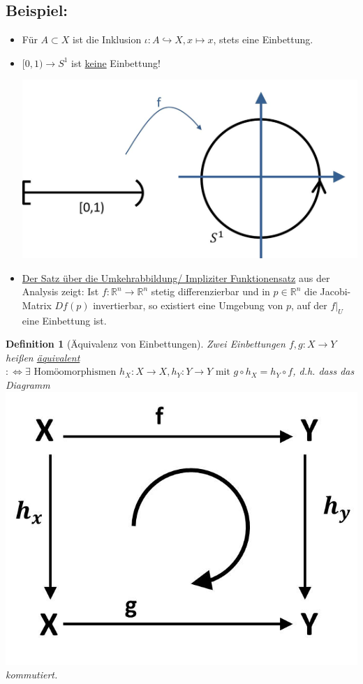 \documentclass[a4paper,11pt,notitlepage]{report}
\newtheorem{definition}{Definition}[chapter]
\newcommand{\R}{{\ensuremath{\mathbb{R}}}}
\newenvironment{bsp}[1]
{
\setlength{\fboxsep}{10pt}
\subsection*{Beispiel: #1}
\begin{upshape}
}
{
\end{upshape}
}
\begin{document}
\begin{bsp}{}
	\begin{itemize}
		\item Für $A \subset X$ ist die Inklusion $\iota \colon A \hookrightarrow X, x \mapsto x$, stets eine Einbettung.
		\item $[0,1) \rightarrow S^1$ ist \underline{keine} Einbettung!
		\begin{center}
			\includegraphics[scale=0.25]{images/0_1_nach_S1_Pfeil.jpg}
		\end{center}
		\item \underline{Der Satz über die Umkehrabbildung/ Impliziter Funktionensatz} aus der Analysis zeigt: 
			\newline
			Ist $f \colon \R^n \rightarrow \R^n$ stetig differenzierbar und in $p \in \R^n$ die Jacobi-Matrix $Df(p)$ invertierbar, so existiert eine Umgebung von $p$, auf der $f \big |_U$ eine Einbettung ist.
	\end{itemize}
\end{bsp}

\begin{definition}[Äquivalenz von Einbettungen]
	Zwei Einbettungen $f,g \colon X \rightarrow Y$ heißen \underline{äquivalent} $:\Leftrightarrow \exists \text{ Homöomorphismen } h_X \colon X \rightarrow X, h_Y \colon Y \rightarrow Y \text{ mit } g \circ h_X = h_Y \circ f$, d.h. dass das Diagramm 
		\includegraphics[scale=0.3]{images/homotopieaequivalenz.jpg} kommutiert.
\end{definition}
\end{document}
